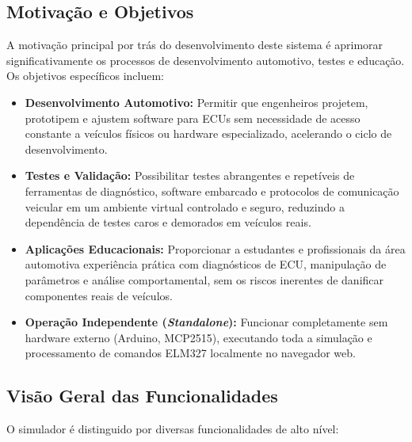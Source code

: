 \subsection{Motivação e Objetivos}

A motivação principal por trás do desenvolvimento deste sistema é aprimorar significativamente os processos de desenvolvimento automotivo, testes e educação. Os objetivos específicos incluem:

\begin{itemize}
    \item \textbf{Desenvolvimento Automotivo:} Permitir que engenheiros projetem, prototipem e ajustem software para ECUs sem necessidade de acesso constante a veículos físicos ou hardware especializado, acelerando o ciclo de desenvolvimento.
    \item \textbf{Testes e Validação:} Possibilitar testes abrangentes e repetíveis de ferramentas de diagnóstico, software embarcado e protocolos de comunicação veicular em um ambiente virtual controlado e seguro, reduzindo a dependência de testes caros e demorados em veículos reais.
    \item \textbf{Aplicações Educacionais:} Proporcionar a estudantes e profissionais da área automotiva experiência prática com diagnósticos de ECU, manipulação de parâmetros e análise comportamental, sem os riscos inerentes de danificar componentes reais de veículos.
    \item \textbf{Operação Independente (\textit{Standalone}):} Funcionar completamente sem hardware externo (Arduino, MCP2515), executando toda a simulação e processamento de comandos ELM327 localmente no navegador web.
\end{itemize}

\subsection{Visão Geral das Funcionalidades}

O simulador é distinguido por diversas funcionalidades de alto nível:

